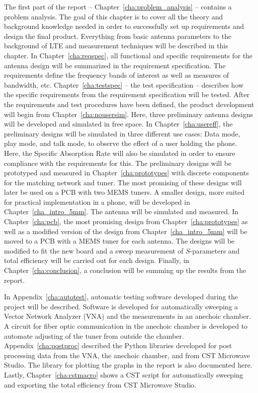 The first part of the report -- Chapter~\ref{cha:problem_analysis} -- contains a problem analysis. The goal of this chapter is to cover all the theory and background knowledge needed in order to successfully set up requirements and design the final product. Everything from basic antenna parameters to the background of LTE and measurement techniques will be described in this chapter. 
In Chapter~\ref{cha:reqspec}, all functional and specific requirements for the antenna design will be summarized in the requirement specification. The requirements define the frequency bands of interest as well as measures of bandwidth, etc. 
Chapter~\ref{cha:testspec} -- the test specification -- describes how the specific requirements from the requirement specification will be tested.
After the requirements and test procedures have been defined, the product development will begin from Chapter~\ref{cha:nousersim}. Here, three preliminary antenna designs will be developed and simulated in free space. 
In Chapter~\ref{cha:usereff}, the preliminary designs will be simulated in three different use cases: Data mode, play mode, and talk mode, to observe the effect of a user holding the phone. Here, the Specific Absorption Rate will also be simulated in order to ensure compliance with the requirements for this.
The preliminary designs will be prototyped and measured in Chapter~\ref{cha:prototypes} with discrete components for the matching network and tuner. The most promising of these designs will later be used on a PCB with two MEMS tuners.
A smaller design, more suited for practical implementation in a phone, will be developed in Chapter~\ref{cha_intro_5mm}. The antenna will be simulated and measured.
In Chapter~\ref{cha:pcb}, the most promising design from Chapter~\ref{cha:prototypes} as well as a modified version of the design from Chapter~\ref{cha_intro_5mm} will be moved to a PCB with a MEMS tuner for each antenna. The designs will be modified to fit the new board and a sweep measurement of $S$-parameters and total efficiency will be carried out for each design.
Finally, in Chapter~\ref{cha:conclusion}, a conclusion will be summing up the results from the report.

In Appendix~\ref{cha:autotest}, automatic testing software developed during the project will be described. Software is developed for automatically sweeping a Vector Network Analyzer (VNA) and the measurements in an anechoic chamber. A circuit for fiber optic communication in the anechoic chamber is developed to automate adjusting of the tuner from outside the chamber.
Appendix~\ref{cha:postproc} described the Python libraries developed for post processing data from the VNA, the anechoic chamber, and from CST Microwave Studio. The library for plotting the graphs in the report is also documented here.
Lastly, Chapter~\ref{cha:cstmacro} shows a CST script for automatically sweeping and exporting the total efficiency from CST Microwave Studio.


